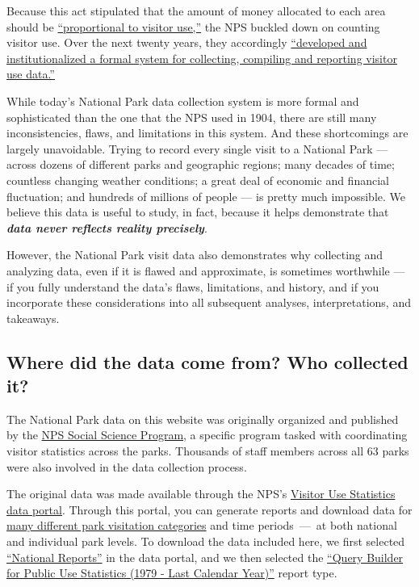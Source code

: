 \documentclass[
  letterpaper,
  DIV=11,
  numbers=noendperiod]{scrartcl}
\begin{document}
Because this act stipulated that the amount of money allocated to each
area should be
\href{https://www.nps.gov/subjects/socialscience/statistics-history.htm}{``proportional
to visitor use,''} the NPS buckled down on counting visitor use. Over
the next twenty years, they accordingly
\href{https://www.nps.gov/subjects/socialscience/statistics-history.htm}{``developed
and institutionalized a formal system for collecting, compiling and
reporting visitor use data.''}

While today's National Park data collection system is more formal and
sophisticated than the one that the NPS used in 1904, there are still
many inconsistencies, flaws, and limitations in this system. And these
shortcomings are largely unavoidable. Trying to record every single
visit to a National Park --- across dozens of different parks and
geographic regions; many decades of time; countless changing weather
conditions; a great deal of economic and financial fluctuation; and
hundreds of millions of people --- is pretty much impossible. We believe
this data is useful to study, in fact, because it helps demonstrate that
\textbf{\emph{data never reflects reality precisely}}.

However, the National Park visit data also demonstrates why collecting
and analyzing data, even if it is flawed and approximate, is sometimes
worthwhile --- if you fully understand the data's flaws, limitations,
and history, and if you incorporate these considerations into all
subsequent analyses, interpretations, and takeaways.

\subsection{Where did the data come from? Who collected
it?}\label{where-did-the-data-come-from-who-collected-it}

The National Park data on this website was originally organized and
published by the
\href{https://www.nps.gov/subjects/socialscience/visitor-use-statistics.htm}{NPS
Social Science Program}, a specific program tasked with coordinating
visitor statistics across the parks. Thousands of staff members across
all 63 parks were also involved in the data collection process.

The original data was made available through the NPS's
\href{https://irma.nps.gov/Stats/}{Visitor Use Statistics data portal}.
Through this portal, you can generate reports and download data for
\href{https://irma.nps.gov/Stats/Reports/National}{many different park
visitation categories} and time periods~---~at both national and
individual park levels. To download the data included here, we first
selected \href{https://irma.nps.gov/Stats/Reports/National}{``National
Reports''} in the data portal, and we then selected the
\href{https://irma.nps.gov/Stats/SSRSReports/National\%20Reports/Query\%20Builder\%20for\%20Public\%20Use\%20Statistics\%20(1979\%20-\%20Last\%20Calendar\%20Year)}{``Query
Builder for Public Use Statistics (1979 - Last Calendar Year)''} report
type.
\end{document}
